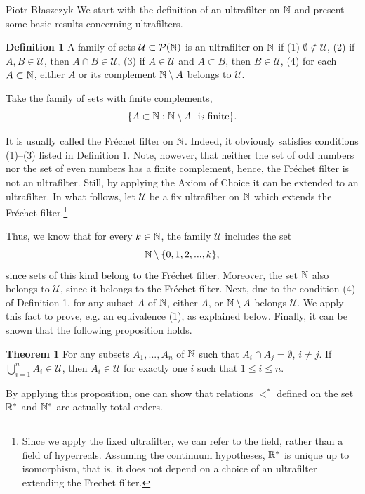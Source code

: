 \begin{artengenv}{Piotr Błaszczyk}
 We start with
 the definition of an ultrafilter  on  ${\mathbb{N}}$ and present some basic results concerning ultrafilters.

  \textbf{Definition 1} A family of sets $\mathcal U\subset \mathcal P ({\mathbb{N}})$ is an
  ultrafilter on ${\mathbb{N}}$ if (1) $\emptyset \notin \mathcal U$, (2) if $A,B\in\mathcal U$,
   then $A\cap B\in\mathcal U$, (3) if $A\in\mathcal U$ and $A\subset B$,
   then $B\in\mathcal U$, (4) for each  $A\subset {\mathbb{N}}$, either $A$ or its
   complement ${\mathbb{N}}\setminus A$ belongs to $\mathcal U$.


   Take the family of  sets with  finite complements,
   \[\{A\subset\N:  \N\setminus A\ \ \mbox{is\ finite}\}.\]

It  is usually called the Fr\'{e}chet  filter on ${\mathbb{N}}$. Indeed, it obviously  satisfies conditions (1)--(3) listed in  Definition 1. Note, however, that neither the set of odd numbers nor the set of even numbers has a finite complement, hence, the Fr\'{e}chet  filter is not an ultrafilter.
   Still, by  applying the Axiom of Choice it can be  extended to an
ultrafilter. In what follows, let $\mathcal U$ be a fix ultrafilter on ${\mathbb{N}}$ which extends the
 Fr\'{e}chet  filter.\footnote{Since we apply the fixed ultrafilter, we can refer to the field, rather than a field of hyperreals.    Assuming the continuum hypotheses, ${\mathbb{R}}^*$  is unique up to isomorphism, that is,  it does not depend on a choice of an ultrafilter extending the Frechet filter.}


 Thus, we know that for every $k\in{\mathbb{N}}$, the family $\mathcal U$ includes the set
\[{\mathbb{N}}\setminus \{0,1,2,...,k\},\]
since  sets of this kind belong to the Fr\'{e}chet  filter.  Moreover, the set ${\mathbb{N}}$ also belongs to $\mathcal U$, since it belongs to the  Fr\'{e}chet  filter.
Next,  due to the condition (4) of Definition 1, for any subset $A$ of ${\mathbb{N}}$, either $A$, or ${\mathbb{N}}\setminus A$
belongs $ \mathcal U$. We apply this fact to prove, e.g. an equivalence  (1), as explained below.
Finally, it can be shown that the following proposition holds.

\textbf{Theorem 1} For any subsets $A_1,...,A_n$ of ${\mathbb{N}}$ such that $A_i\cap A_j=\emptyset$, $i\neq j$. If
$\bigcup_{i=1}^{n} A_i\in\mathcal U$, then  $A_i\in \mathcal U$ for exactly one $i$ such that $1\leq i\leq n$.

By applying this proposition, one can show that relations $<^*$ defined on the set ${\mathbb{R}}^*$ and ${\mathbb{N}}^*$ are actually total orders.


\end{artengenv}
